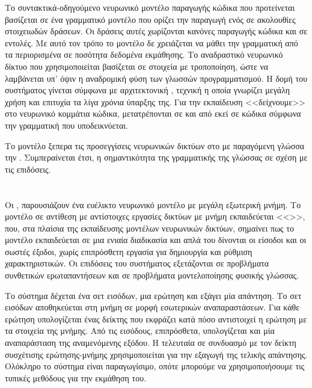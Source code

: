 Το συντακτικά-οδηγούμενο νευρωνικό μοντέλο παραγωγής κώδικα που προτείνεται βασίζεται σε ένα γραμματικό μοντέλο που ορίζει την παραγωγή ενός  σε ακολουθίες στοιχειωδών δράσεων.
Οι δράσεις αυτές χωρίζονται κανόνες παραγωγής κώδικα και σε εντολές.
Με αυτό τον τρόπο το μοντέλο δε χρειάζεται να μάθει την γραμματική από τα περιορισμένα σε ποσότητα δεδομένα εκμάθησης.
Το αναδραστικό νευρωνικό δίκτυο που χρησιμοποιείται βασίζεται σε στοιχεία  με τροποποίηση, ώστε να λαμβάνεται υπ' όψιν η αναδρομική φύση των γλωσσών προγραμματισμού.
Η δομή του συστήματος γίνεται σύμφωνα με αρχιτεκτονική  \cite{Bahdanau2014}, τεχνική η οποία γνωρίζει μεγάλη χρήση και επιτυχία τα λίγα χρόνια ύπαρξης της.
Για την εκπαίδευση <<δείχνουμε>> στο νευρωνικό κομμάτια κώδικα, μετατρέπονται σε και από εκεί σε κώδικα σύμφωνα την γραμματική που υποδεικνύεται.

Το μοντέλο ξεπερα τις  προσεγγίσεις νευρωνικών δικτύων στο  με παραγόμενη γλώσσα την .
Συμπεραίνεται έτσι, η σημαντικότητα της γραμματικής της γλώσσας σε σχέση με τις επιδόσεις. 

\section{}

Οι , \cite{Sukhbaatar2015} παρουσιάζουν ένα ευέλικτο νευρωνικό μοντέλο με μεγάλη εξωτερική μνήμη. 
Το μοντέλο σε αντίθεση με αντίστοιχες εργασίες δικτύων με μνήμη εκπαιδεύεται <<>>, που, στα πλαίσια της εκπαίδευσης μοντέλων νευρωνικών δικτύων, σημαίνει πως το μοντέλο εκπαιδεύεται σε μια ενιαία διαδικασία και απλά του δίνονται οι είσοδοι και οι σωστές έξοδοι, χωρίς επιπρόσθετη εργασία για δημιουργία και ρύθμιση χαρακτηριστικών. Οι επιδόσεις του συστήματος εξετάζονται σε προβλήματα συνθετικών ερωταπαντήσεων και σε προβλήματα μοντελοποίησης φυσικής γλώσσας.

Το σύστημα δέχεται ένα σετ εισόδων, μια ερώτηση και εξάγει μία απάντηση. 
Το σετ εισόδων αποθηκεύεται στη μνήμη σε μορφή εσωτερικών αναπαραστάσεων. Για κάθε ερώτηση υπολογίζεται ένας δείκτης που εκφράζει κατά πόσο αντιστοιχεί η ερώτηση με τα στοιχεία της μνήμης.
Από τις εισόδους, επιπρόσθετα, υπολογίζεται και μία αναπαράσταση της αναμενόμενης εξόδου.
Η τελευταία σε συνδυασμό με τον δείκτη συσχέτισης ερώτησης-μνήμης χρησιμοποιείται για την εξαγωγή της τελικής απάντησης. Ολόκληρο το σύστημα είναι παραγωγίσιμο, οπότε μπορούμε να χρησιμοποιήσουμε τις τυπικές μεθόδους για την εκμάθηση του.

